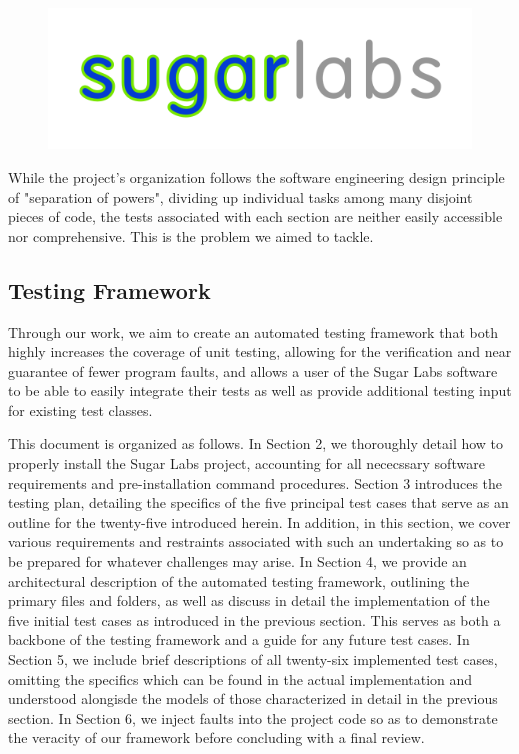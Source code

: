 \documentclass{article}
\begin{document}
\begin{figure}
\centering
\includegraphics[scale=0.5]{../imgs/Figure4.png}
\end{figure}

While the project's organization follows the software engineering design principle of "separation of powers", dividing up individual tasks among many disjoint pieces of code, the tests associated with each section are neither easily accessible nor comprehensive. This is the problem we aimed to tackle.
\subsection{Testing Framework}
Through our work, we aim to create an automated testing framework that both highly increases the coverage of unit testing, allowing for the verification and near guarantee of fewer program faults, and allows a user of the Sugar Labs software to be able to easily integrate their tests as well as provide additional testing input for existing test classes.

This document is organized as follows. In Section 2, we thoroughly detail how to properly install the Sugar Labs project, accounting for all nececssary software requirements and pre-installation command procedures. Section 3 introduces the testing plan, detailing the specifics of the five principal test cases that serve as an outline for the twenty-five introduced herein. In addition, in this section, we cover various requirements and restraints associated with such an undertaking so as to be prepared for whatever challenges may arise. In Section 4, we provide an architectural description of the automated testing framework, outlining the primary files and folders, as well as discuss in detail the implementation of the five initial test cases as introduced in the previous section. This serves as both a backbone of the testing framework and a guide for any future test cases. In Section 5, we include brief descriptions of all twenty-six implemented test cases, omitting the specifics which can be found in the actual implementation and understood alongisde the models of those characterized in detail in the previous section. In Section 6, we inject faults into the project code so as to demonstrate the veracity of our framework before concluding with a final review.
\end{document}

